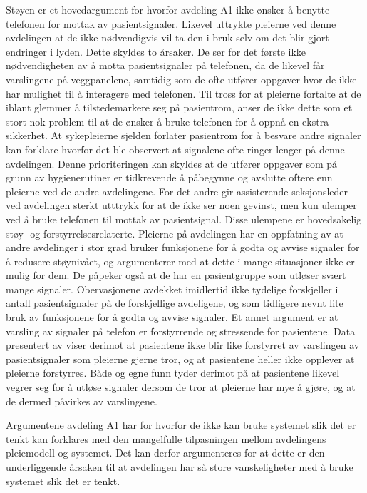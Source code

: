\noindent
Støyen er et hovedargument for hvorfor avdeling A1 ikke ønsker å benytte telefonen for mottak av pasientsignaler. Likevel uttrykte pleierne ved denne avdelingen at de ikke nødvendigvis vil ta den i bruk selv om det blir gjort endringer i lyden. Dette skyldes to årsaker. De ser for det første ikke nødvendigheten av å motta pasientsignaler på telefonen, da de likevel får varslingene på veggpanelene, samtidig som de ofte utfører oppgaver hvor de ikke har mulighet til å interagere med telefonen. Til tross for at pleierne fortalte at de iblant glemmer å tilstedemarkere seg på pasientrom, anser de ikke dette som et stort nok problem til at de ønsker å bruke telefonen for å oppnå en ekstra sikkerhet. At sykepleierne sjelden forlater pasientrom for å besvare andre signaler kan forklare hvorfor det ble observert at signalene ofte ringer lenger på denne avdelingen. Denne prioriteringen kan skyldes at de utfører oppgaver som på grunn av hygienerutiner er tidkrevende å påbegynne og avslutte oftere enn pleierne ved de andre avdelingene. For det andre gir assisterende seksjonsleder ved avdelingen sterkt utttrykk for at de ikke ser noen gevinst, men kun ulemper ved å bruke telefonen til mottak av pasientsignal. Disse ulempene er hovedsakelig støy- og forstyrrelsesrelaterte. Pleierne på avdelingen har en oppfatning av at andre avdelinger i stor grad bruker funksjonene for å godta og avvise signaler for å redusere støynivået, og argumenterer med at dette i mange situasjoner ikke er mulig for dem. De påpeker også at de har en pasientgruppe som utløser svært mange signaler. Obervasjonene avdekket imidlertid ikke tydelige forskjeller i antall pasientsignaler på de forskjellige avdeligene, og som tidligere nevnt lite bruk av funksjonene for å godta og avvise signaler.
Et annet argument er at varsling av signaler på telefon er forstyrrende og stressende for pasientene. Data presentert av \citet{Rygh13} viser derimot at pasientene ikke blir like forstyrret av varslingen av pasientsignaler som pleierne gjerne tror, og at pasientene heller ikke opplever at pleierne forstyrres. Både \citet{Rygh13} og egne funn tyder derimot på at pasientene likevel vegrer seg for å utløse signaler dersom de tror at pleierne har mye å gjøre, og at de dermed påvirkes av varslingene.

\noindent
Argumentene avdeling A1 har for hvorfor de ikke kan bruke systemet slik det er tenkt kan forklares med den mangelfulle tilpasningen mellom avdelingens pleiemodell og systemet. Det kan derfor argumenteres for at dette er den underliggende årsaken til at avdelingen har så store vanskeligheter med å bruke systemet slik det er tenkt. 

